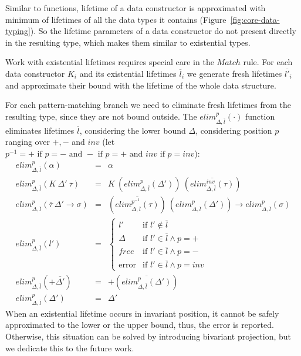 \documentclass[11pt]{article}
\newcommand{\ap}{~}
\begin{document}
    Similar to functions, lifetime of a data constructor is approximated with minimum of lifetimes of all the data types it contains (Figure\ \ref{fig:core-data-typing}).
    So the lifetime parameters of a data constructor do not present directly in the resulting type, which makes them similar to existential types. %

    Work with existential lifetimes requires special care in the $Match$ rule.
    For each data constructor $K_i$ and its existential lifetimes $\overline{l}_i$ we generate fresh lifetimes $\overline{l'}_i$ and approximate their bound with the lifetime of the whole data structure.

    For each pattern-matching branch we need to eliminate fresh lifetimes from the resulting type, since they are not bound outside. %
    The $elim_{\Delta, \overline{l}}^p(\cdot)$ function eliminates lifetimes $\overline{l}$, considering the lower bound $\Delta$, considering position $p$ ranging over $+, -$ and $inv$ (let $p^{-1} = + \text{ if } p = - \text{ and } - \text{ if } p = + \text{ and } inv \text{ if } p = inv$):
    \[
        \begin{array}{lll}
            elim_{\Delta, \overline{l}}^p(\alpha) & = & \alpha \\
            elim_{\Delta, \overline{l}}^p(K\ap \Delta'\ap\overline{\tau}) & = & K\ap \left( elim_{\Delta, \overline{l}}^p(\Delta') \right)\ap\left( \overline{elim_{\Delta, \overline{l}}^{inv}(\tau)} \right) \\
            elim_{\Delta, \overline{l}}^p(\overline{\tau}~\Delta'\to\sigma) & = & \left( \overline{elim_{\Delta, \overline{l}}^{p^{-1}}(\tau)} \right)~\left( elim_{\Delta, \overline{l}}^p(\Delta') \right)\to elim_{\Delta, \overline{l}}^{p}(\sigma) \\
            elim_{\Delta, \overline{l}}^{p}(l') & = &
            \begin{cases}
                l'     & \text{if } l' \not\in\overline{l} \\
                \Delta & \text{if } l' \in \overline{l} \land p = + \\
                free   & \text{if } l' \in \overline{l} \land p = - \\
                \text{error}  & \text{if } l' \in \overline{l} \land p = inv
            \end{cases} \\
            elim_{\Delta, \overline{l}}^{p}(+\overline{\Delta'}) & = & +\left( \overline{elim_{\Delta, \overline{l}}^{p}(\Delta')} \right) \\
            elim_{\Delta, \overline{l}}^{p}(\Delta') & = & \Delta'
        \end{array}
    \] %
    When an existential lifetime occurs in invariant position, it cannot be safely approximated to the lower or the upper bound, thus, the error is reported.
    Otherwise, this situation can be solved by introducing bivariant projection, but we dedicate this to the future work. %
\end{document}
